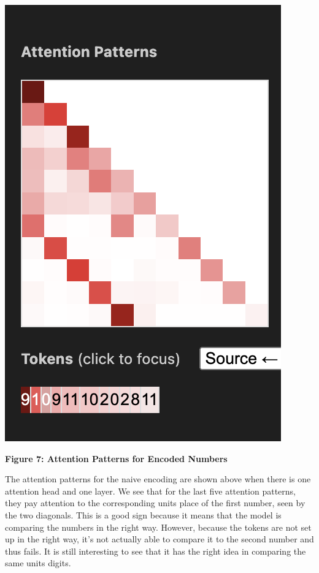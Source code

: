 \documentclass{article}
\begin{document}
\begin{center}
    \includegraphics[scale=0.4]{images/att_encoding3.png}

    \textbf{Figure 7: Attention Patterns for Encoded Numbers}
\end{center}

The attention patterns for the naive encoding are shown above when there is one attention head and one layer. We see that for the last five attention patterns, they pay attention to the corresponding units place of the first number, seen by the two diagonals. This is a good sign because it means that the model is comparing the numbers in the right way. However, because the tokens are not set up in the right way, it's not actually able to compare it to the second number and thus fails. It is still interesting to see that it has the right idea in comparing the same units digits. 
\end{document}
